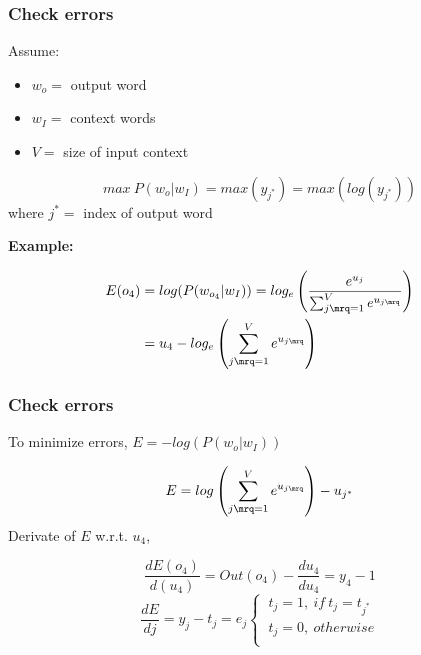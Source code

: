 \documentclass{beamer}   %
\begin{document}

\begin{frame}[t]
\frametitle{Check errors}
    Assume: \par
    \begin{itemize}
        \item $w_o = $ output word
        \item $w_I = $ context words
        \item $V = $ size of input context
    \end{itemize}
    $$max\ P(w_o \rvert w_I) = max(y_{j^*}) = max(log(y_{j^*}))$$
    where $j^* =$ index of output word \par
    \vspace{1em}
    \textbf{Example:} \par
    \vspace{-1.5em}
    \begin{align*}
        E(o_4) &= log(P(w_{o_4} \rvert w_I)) = log_e\left(\frac{e^{u_j}}{\sum_{j\mrq=1}^{V} e^{u_{j\mrq}}}\right) \\
               &= u_4 - log_e\left(\sum_{j\mrq=1}^{V} e^{u_{j\mrq}}\right)
    \end{align*}
\end{frame}


\begin{frame}[t]
\frametitle{Check errors}
    To minimize errors, $ E = -log(P(w_o \rvert w_I))$ \par
    $$E = log\left(\sum_{j\mrq=1}^{V} e^{u_{j\mrq}}\right) - u_{j^*}$$
    Derivate of $E$ w.r.t. $u_4$, \par
    $$\frac{dE(o_4)}{d(u_4)} = Out(o_4) - \frac{du_4}{du_4} = y_4 - 1$$
    \begin{equation*}
        \frac{dE}{dj} = y_j - t_j = e_j
        \begin{cases}
            \ t_j = 1,\ if\ t_j = t_{j^*} \\
            \ t_j = 0,\ otherwise  \\
        \end{cases}
    \end{equation*}
\end{frame}

\end{document}
